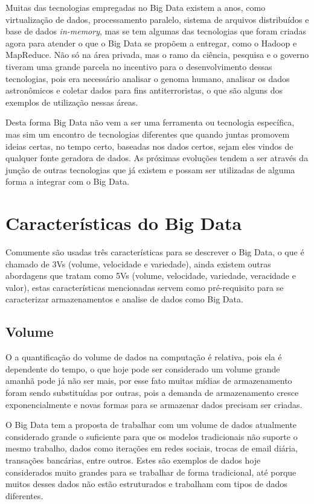 Muitas das tecnologias empregadas no Big Data existem a anos, como virtualização de dados, processamento paralelo, sistema de arquivos distribuídos e base de dados \textit{in-memory}, mas se tem algumas das tecnologias que foram criadas agora para atender o que o Big Data se propõem a entregar, como o Hadoop e MapReduce. Não só na área privada, mas o ramo da ciência, pesquisa e o governo tiveram uma grande parcela no incentivo para o desenvolvimento dessas tecnologias, pois era necessário analisar o genoma humano, analisar os dados astronômicos e coletar dados para fins antiterroristas, o que são alguns dos exemplos de utilização nessas áreas.~\cite{leigos}

Desta forma Big Data não vem a ser uma ferramenta ou tecnologia específica, mas sim um encontro de tecnologias diferentes que quando juntas promovem ideias certas, no tempo certo, baseadas nos dados certos, sejam eles vindos de qualquer fonte geradora de dados. As próximas evoluções tendem a ser através da junção de outras tecnologias que já existem e possam ser utilizadas de alguma forma a integrar com o Big Data.~\cite{leigos}

\section{Características do Big Data}
\label{sec:funcbigdata}
Comumente são usadas três características para se descrever o Big Data, o que é chamado de 3Vs (volume, velocidade e variedade), ainda existem outras abordagens que tratam como 5Vs (volume, velocidade, variedade, veracidade e valor), estas características mencionadas servem como pré-requisito para se caracterizar armazenamentos e analise de dados como Big Data.

\subsection{Volume}
\label{subsec:volume}
O a quantificação do volume de dados na computação é relativa, pois ela é dependente do tempo, o que hoje pode ser considerado um volume grande amanhã pode já não ser mais, por esse fato muitas mídias de armazenamento foram sendo substituídas por outras, pois a demanda de armazenamento cresce exponencialmente e novas formas para se armazenar dados precisam ser criadas.~\cite{forbes} 

O Big Data tem a proposta de trabalhar com um volume de dados atualmente considerado grande o suficiente para que os modelos tradicionais não suporte o mesmo trabalho, dados como iterações em redes sociais, trocas de email diária, transações bancárias, entre outros. Estes são exemplos de dados hoje considerados muito grandes para se trabalhar de forma tradicional, até porque muitos desses dados não estão estruturados e trabalham com tipos de dados diferentes.~\cite{forbes}  


